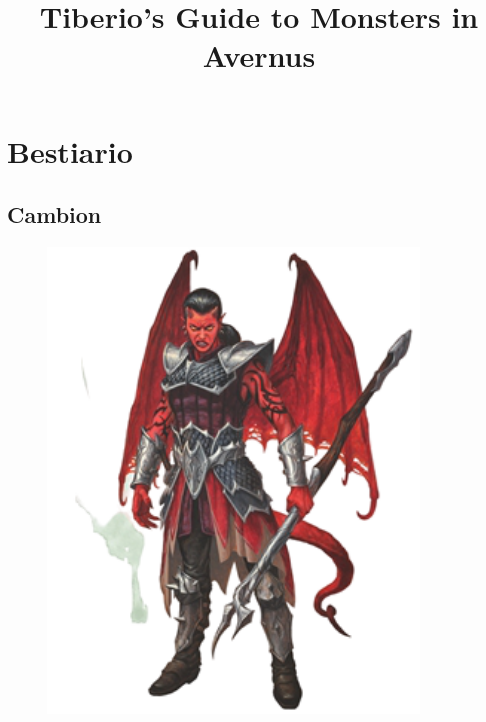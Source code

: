 \documentclass[oneside]{clgrammar}
\title{Tiberio's Guide to Monsters in Avernus}
\author{}
\begin{document}
\maketitle
\frontmatter
\tableofcontents

\mainmatter
\chapter{Bestiario}
\section{Cambion}
\begin{figure}[h!]
\centering
\includegraphics[width=280pt]{images/monstros/cambion-removebg-preview.png}
\end{figure}
\newpage
\end{document}
